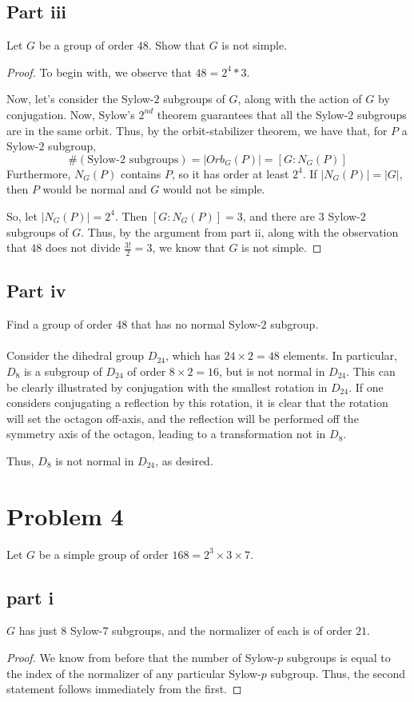 \documentclass[12pt,reqno]{amsart}
\begin{document}
\subsection*{Part iii}
Let $G$ be a group of order $48$. Show that $G$ is not simple.
\\
\begin{proof}
    To begin with, we observe that $48 = 2^4*3$.

    Now, let's consider the Sylow-$2$ subgroups of $G$, along with the action
    of $G$ by conjugation. Now, Sylow's $2^{nd}$ theorem guarantees that all
    the Sylow-$2$ subgroups are in the same orbit. Thus, by the orbit-stabilizer
    theorem, we have that, for $P$ a Sylow-$2$ subgroup,
    \[
        \#(\textrm{Sylow-$2$ subgroups}) = |Orb_G(P)|=[G:N_G(P)]
    \]
    Furthermore, $N_G(P)$ contains $P$, so it has order at least $2^4$.
    If $|N_G(P)| = |G|$, then $P$ would be normal and $G$ would not be simple.

    So, let $|N_G(P)| = 2^4$. Then $[G:N_G(P)] = 3$, and there are $3$ Sylow-$2$
    subgroups of $G$. Thus, by the argument from part ii, along with the
    observation that $48$ does not divide $\frac{3!}{2} = 3$, we know that $G$
    is not simple.
\end{proof}

\subsection*{Part iv}
Find a group of order 48 that has no normal Sylow-$2$ subgroup.
\\
\\
Consider the dihedral group $D_{24}$, which has $24\times 2=48$ elements. In
particular, $D_8$ is a subgroup of $D_{24}$ of order $8\times 2=16$, but is not
normal in $D_{24}$. This can be clearly illustrated by conjugation with the
smallest rotation in $D_{24}$. If one considers conjugating a reflection by this
rotation, it is clear that the rotation will set the octagon off-axis, and the
reflection will be performed off the symmetry axis of the octagon, leading to a
transformation not in $D_8$.

Thus, $D_8$ is not normal in $D_{24}$, as desired.

\newpage

\section*{Problem 4}
Let $G$ be a simple group of order $168=2^3\times3\times7$.

\subsection*{part i}
$G$ has just $8$ Sylow-$7$ subgroups, and the normalizer of each is of order
$21$.
\\
\begin{proof}
We know from before that the number of Sylow-$p$ subgroups is equal to the index
    of the normalizer of any particular Sylow-$p$ subgroup. Thus, the second
    statement follows immediately from the first.

\end{proof}
\end{document}
